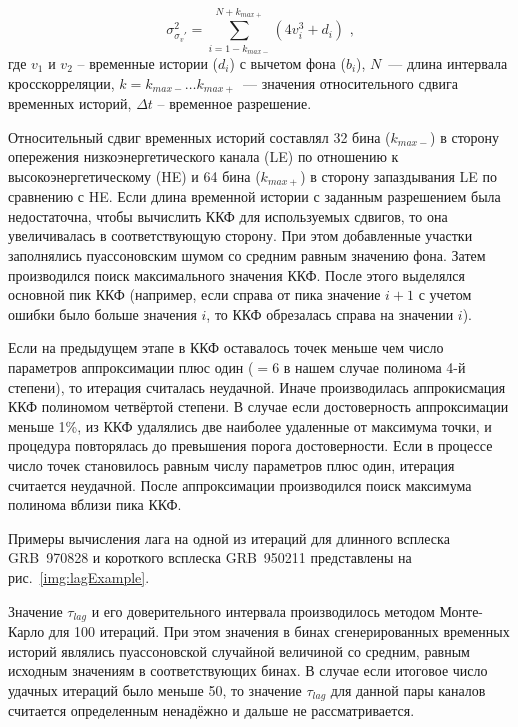 \begin{equation}
\sigma_{\sigma_{v}'}^2 = \sum_{i=1-k_{max-}}^{N+k_{max+}}(4 v_i^3 +d_i)\mbox{ ,}
\end{equation}
где $v_1$ и $v_2$ -- временные истории ($d_i$) с вычетом фона ($b_i$), 
$N$~--- длина интервала кросскорреляции, $k=k_{max-} \dotso k_{max+}$~--- значения 
относительного сдвига временных историй, $\Delta t$ -- временное разрешение.

Относительный сдвиг временных историй составлял 32 бина ($k_{max-}$) в сторону 
опережения низкоэнергетического канала (LE) по отношению к высокоэнергетическому (HE) 
и 64 бина ($k_{max+}$) в сторону запаздывания LE по сравнению с HE. 
Если длина временной истории с заданным разрешением была недостаточна, чтобы 
вычислить ККФ для используемых сдвигов, то она увеличивалась в соответствующую 
сторону. При этом добавленные участки заполнялись пуассоновским шумом со средним 
равным значению фона. Затем производился поиск максимального значения ККФ. 
После этого выделялся основной пик ККФ (например, если справа от пика значение 
$i+1$ с учетом ошибки было больше значения $i$, то ККФ обрезалась справа на значении $i$). 

Если на предыдущем этапе в ККФ оставалось точек меньше чем число параметров 
аппроксимации плюс один ($=6$ в нашем случае полинома 4-й степени), 
то итерация считалась неудачной. Иначе производилась аппрокисмация ККФ полиномом 
четвёртой степени. В случае если достоверность аппроксимации меньше 1\%, 
из ККФ удалялись две наиболее удаленные от максимума точки, и процедура повторялась 
до превышения порога достоверности. Если в процессе число точек становилось равным 
числу параметров плюс один, итерация считается неудачной. После аппроксимации 
производился поиск максимума полинома вблизи пика ККФ.

Примеры вычисления лага на одной из итераций для длинного всплеска GRB~970828 и 
короткого всплеска GRB~950211 представлены на рис.~\ref{img:lagExample}.

Значение  $\tau_{lag}$  и его доверительного интервала производилось методом 
Монте-Карло для 100 итераций. При этом значения в бинах сгенерированных временных 
историй являлись пуассоновской случайной величиной со средним, равным исходным 
значениям в соответствующих бинах. В случае если итоговое число удачных итераций 
было меньше 50, то значение $\tau_{lag}$  для данной пары каналов считается 
определенным ненадёжно и дальше не рассматривается.

